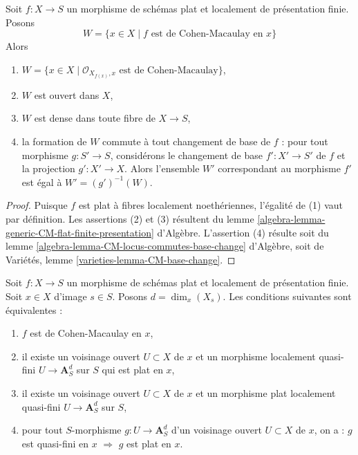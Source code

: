 \begin{lemma}
\label{lemma-flat-finite-presentation-CM-open}
\begin{reference}
\cite[IV, corollaire 12.1.7(iii)]{EGA}
\end{reference}
Soit $f : X \to S$ un morphisme de schémas plat et localement
de présentation finie. Posons
$$
W = \{x \in X \mid f\text{ est de Cohen-Macaulay en }x\}
$$
Alors
\begin{enumerate}
\item $W = \{x \in X \mid \mathcal{O}_{X_{f(x)}, x}\text{ est de Cohen-Macaulay}\}$,
\item $W$ est ouvert dans $X$,
\item $W$ est dense dans toute fibre de $X \to S$,
\item la formation de $W$ commute à tout changement de base de $f$ :
pour tout morphisme $g : S' \to S$, considérons
le changement de base $f' : X' \to S'$ de $f$ et la
projection $g' : X' \to X$. Alors l'ensemble
$W'$ correspondant au morphisme $f'$ est égal à $W' = (g')^{-1}(W)$.
\end{enumerate}
\end{lemma}

\begin{proof}
Puisque $f$ est plat à fibres localement noethériennes, l'égalité de (1)
vaut par définition. Les assertions (2) et (3) résultent du
lemme \ref{algebra-lemma-generic-CM-flat-finite-presentation} d'Algèbre.
L'assertion (4) résulte soit du
lemme \ref{algebra-lemma-CM-locus-commutes-base-change} d'Algèbre,
soit de
Variétés, lemme \ref{varieties-lemma-CM-base-change}.
\end{proof}

\begin{lemma}
\label{lemma-flat-finite-presentation-characterize-CM}
Soit $f : X \to S$ un morphisme de schémas plat et localement
de présentation finie. Soit $x \in X$ d'image $s \in S$.
Posons $d = \dim_x(X_s)$.
Les conditions suivantes sont équivalentes :
\begin{enumerate}
\item $f$ est de Cohen-Macaulay en $x$,
\item il existe un voisinage ouvert $U \subset X$ de $x$
et un morphisme localement quasi-fini $U \to \mathbf{A}^d_S$ sur $S$
qui est plat en $x$,
\item il existe un voisinage ouvert $U \subset X$ de $x$
et un morphisme plat localement quasi-fini $U \to \mathbf{A}^d_S$ sur $S$,
\item pour tout $S$-morphisme $g : U \to \mathbf{A}^d_S$
d'un voisinage ouvert $U \subset X$ de $x$, on a :
$g$ est quasi-fini en $x$ $\Rightarrow$ $g$ est plat en $x$.
\end{enumerate}
\end{lemma}

